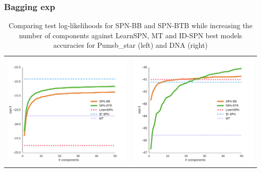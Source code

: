 \documentclass[xcolor={usenames,dvipsnames,svgnames}, compress]{beamer}
\begin{document}
\begin{frame}
  \frametitle{Bagging exp}
  \begin{table}[ht]
    \setlength{\tabcolsep}{2pt}  
    \centering
    \begin{tabular}[t]{c c}
      \includegraphics[width=0.5\linewidth]{figures/curves/pumsb-star-png.pdf}&\includegraphics[width=0.5\linewidth]{figures/curves/dna-png.pdf}\\
    \end{tabular}
    \caption{Comparing test log-likelihoods for \textsf{SPN-BB} and
      \textsf{SPN-BTB} while increasing the number of components against \textsf{LearnSPN}, \textsf{MT} and
      \textsf{ID-SPN} best models accuracies for Pumsb\_star (left)
      and DNA (right)}
  \end{table}
\end{frame}
\end{document}
